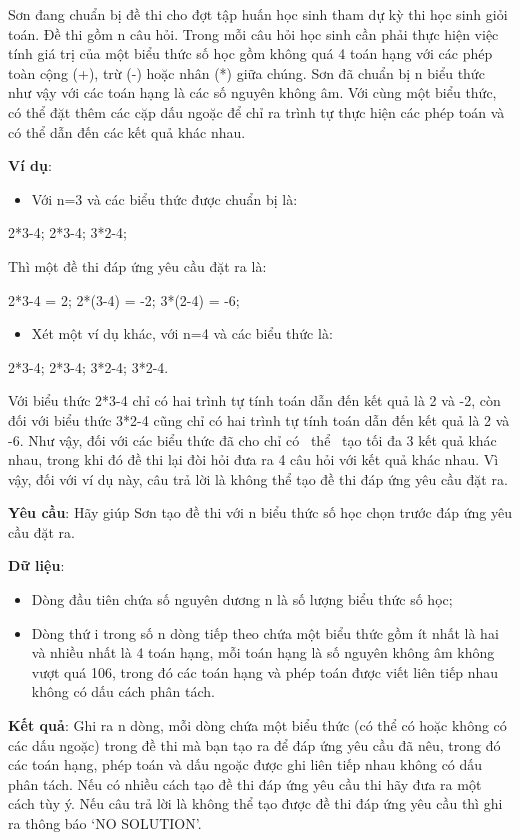 

Sơn đang chuẩn bị đề thi cho đợt tập huấn học sinh tham dự kỳ thi học sinh giỏi toán. Đề thi gồm n câu hỏi. Trong mỗi câu hỏi học sinh cần phải thực hiện việc tính giá trị của một biểu thức số học gồm không quá 4 toán hạng với các phép toàn cộng (+), trừ (-) hoặc nhân (*) giữa chúng. Sơn đã chuẩn bị n biểu thức như vậy với các toán hạng là các số nguyên không âm. Với cùng một biểu thức, có thể đặt thêm các cặp dấu ngoặc để chỉ ra trình tự thực hiện các phép toán và có thể dẫn đến các kết quả khác nhau.

\textbf{Ví dụ}:
\begin{itemize}
	\item Với n=3 và các biểu thức được chuẩn bị là:
\end{itemize}

2*3-4; 2*3-4; 3*2-4;

Thì một đề thi đáp ứng yêu cầu đặt ra là:

2*3-4 = 2; 2*(3-4) = -2; 3*(2-4) = -6;
\begin{itemize}
	\item Xét một ví dụ khác, với n=4 và các biểu thức là:
\end{itemize}

2*3-4; 2*3-4; 3*2-4; 3*2-4.

Với biểu thức 2*3-4 chỉ có hai trình tự tính toán dẫn đến kết quả là 2 và -2, còn đối với biểu thức 3*2-4 cũng chỉ có hai trình tự tính toán dẫn đến kết quả là 2 và -6. Như vậy, đối với các biểu thức đã cho chỉ có  thể  tạo tối đa 3 kết quả khác nhau, trong khi đó đề thi lại đòi hỏi đưa ra 4 câu hỏi với kết quả khác nhau. Vì vậy, đối với ví dụ này, câu trả lời là không thể tạo đề thi đáp ứng yêu cầu đặt ra.

\textbf{Yêu cầu}: Hãy giúp Sơn tạo đề thi với n biểu thức số học chọn trước đáp ứng yêu cầu đặt ra.

\textbf{Dữ liệu}:
\begin{itemize}
	\item Dòng đầu tiên chứa số nguyên dương n là số lượng biểu thức số học;
	\item Dòng thứ i trong số n dòng tiếp theo chứa một biểu thức gồm ít nhất là hai và nhiều nhất là 4 toán hạng, mỗi toán hạng là số nguyên không âm không vượt quá 106, trong đó các toán hạng và phép toán được viết liên tiếp nhau không có dấu cách phân tách.
\end{itemize}

\textbf{Kết quả}: Ghi ra n dòng, mỗi dòng chứa một biểu thức (có thể có hoặc không có các dấu ngoặc) trong đề thi mà bạn tạo ra để đáp ứng yêu cầu đã nêu, trong đó các toán hạng, phép toán và dấu ngoặc được ghi liên tiếp nhau không có dấu phân tách. Nếu có nhiều cách tạo đề thi đáp ứng yêu cầu thi hãy đưa ra một cách tùy ý. Nếu câu trả lời là không thể tạo được đề thi đáp ứng yêu cầu thì ghi ra thông báo ‘NO SOLUTION’.

